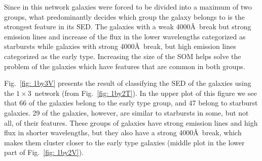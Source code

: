             Since in this network galaxies were forced to be divided into a maximum of two groups, what predominantly decides which group the galaxy belongs to is the strongest feature in its SED.
            The galaxies with a weak 4000\AA~break but strong emission lines and increase of the flux in the lower wavelengths categorized as starbursts while galaxies with strong 4000\AA~break, but high emission lines categorized as the early type.
            Increasing the size of the SOM helps solve the problem of the galaxies which have features that are common in both groups.
            
            Fig.~\ref{fig: 1by3V} presents the result of classifying the SED of the galaxies using the $1\times3$~network (from Fig.~\ref{fig: 1by2T}). 
            In the upper plot of this figure we see that 66 of the galaxies belong to the early type group, and 47 belong to starburst galaxies. 
            29 of the galaxies, however, are similar to starbursts in some, but not all, of their features. 
            These groups of galaxies have strong emission lines and high flux in shorter wavelengths, but they also have a strong 4000\AA~break, which makes them cluster closer to the early type galaxies (middle plot in the lower part of Fig.~\ref{fig: 1by2V}).

